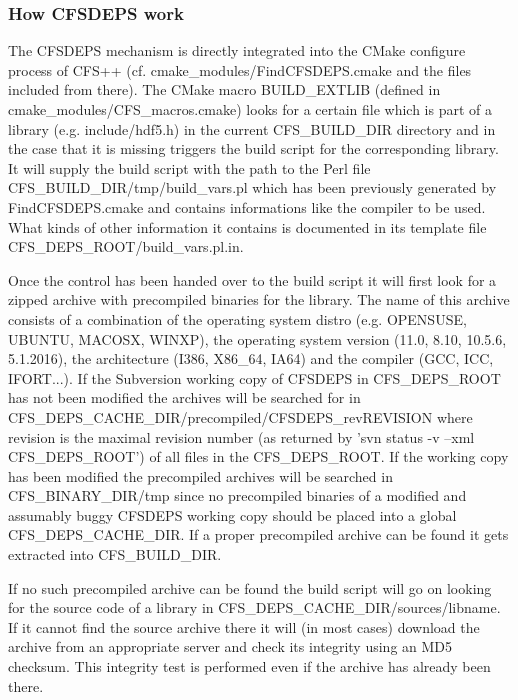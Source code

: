 \subsubsection{How CFSDEPS work}

The CFSDEPS mechanism is directly  integrated into the CMake configure process
of CFS++  (cf.  cmake\_modules/FindCFSDEPS.cmake  and the files  included from
there).       The     CMake      macro      BUILD\_EXTLIB     (defined      in
cmake\_modules/CFS\_macros.cmake) looks for a certain  file which is part of a
library (e.g.  include/hdf5.h) in the current CFS\_BUILD\_DIR directory and in
the case  that it is missing  triggers the build script  for the corresponding
library.   It will supply  the build  script with  the path  to the  Perl file
CFS\_BUILD\_DIR/tmp/build\_vars.pl  which  has  been previously  generated  by
FindCFSDEPS.cmake and contains informations like the compiler to be used. What
kinds  of other information  it contains  is documented  in its  template file
CFS\_DEPS\_ROOT/build\_vars.pl.in.

Once the control has  been handed over to the build script  it will first look
for a zipped  archive with precompiled binaries for the  library.  The name of
this  archive  consists  of  a  combination of  the  operating  system  distro
(e.g. OPENSUSE,  UBUNTU, MACOSX, WINXP),  the operating system  version (11.0,
8.10,  10.5.6,  5.1.2016), the  architecture  (I386,  X86\_64,  IA64) and  the
compiler (GCC,  ICC, IFORT...). If the  Subversion working copy  of CFSDEPS in
CFS\_DEPS\_ROOT has  not been  modified the archives  will be searched  for in
CFS\_DEPS\_CACHE\_DIR/precompiled/CFSDEPS\_revREVISION  where revision  is the
maximal revision number (as returned by 'svn status -v --xml CFS\_DEPS\_ROOT')
of all files in the CFS\_DEPS\_ROOT. If the working copy has been modified the
precompiled  archives  will  be  searched  in  CFS\_BINARY\_DIR/tmp  since  no
precompiled binaries  of a modified  and assumably buggy CFSDEPS  working copy
should be placed into a global CFS\_DEPS\_CACHE\_DIR.  If a proper precompiled
archive can be found it gets extracted into CFS\_BUILD\_DIR.

If  no such  precompiled archive  can be  found the  build script  will  go on
looking     for      the     source      code     of     a      library     in
CFS\_DEPS\_CACHE\_DIR/sources/libname.  If it cannot  find the  source archive
there it will (in most cases)  download the archive from an appropriate server
and  check  its  integrity using  an  MD5  checksum.  This integrity  test  is
performed even if the archive has already been there.

